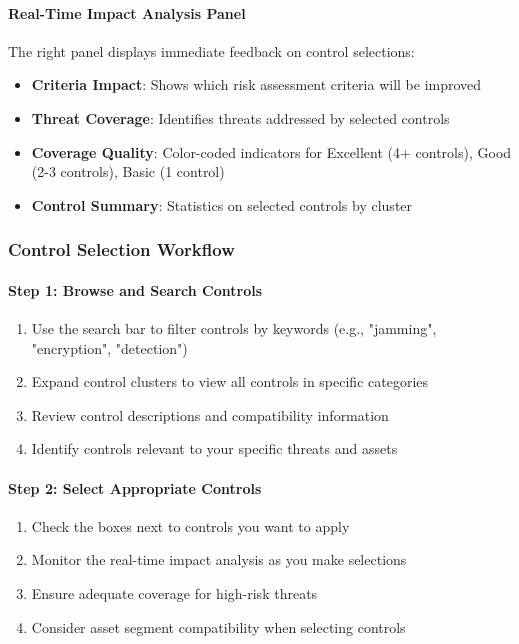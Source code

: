 \documentclass[binding=0.6cm]{sapthesis}
\begin{document}
\paragraph{Real-Time Impact Analysis Panel}
The right panel displays immediate feedback on control selections:

\begin{itemize}
    \item \textbf{Criteria Impact}: Shows which risk assessment criteria will be improved
    \item \textbf{Threat Coverage}: Identifies threats addressed by selected controls
    \item \textbf{Coverage Quality}: Color-coded indicators for Excellent (4+ controls), Good (2-3 controls), Basic (1 control)
    \item \textbf{Control Summary}: Statistics on selected controls by cluster
\end{itemize}

\subsubsection{Control Selection Workflow}

\paragraph{Step 1: Browse and Search Controls}
\begin{enumerate}
    \item Use the search bar to filter controls by keywords (e.g., "jamming", "encryption", "detection")
    \item Expand control clusters to view all controls in specific categories
    \item Review control descriptions and compatibility information
    \item Identify controls relevant to your specific threats and assets
\end{enumerate}

\paragraph{Step 2: Select Appropriate Controls}
\begin{enumerate}
    \item Check the boxes next to controls you want to apply
    \item Monitor the real-time impact analysis as you make selections
    \item Ensure adequate coverage for high-risk threats
    \item Consider asset segment compatibility when selecting controls
\end{enumerate}
\end{document}
